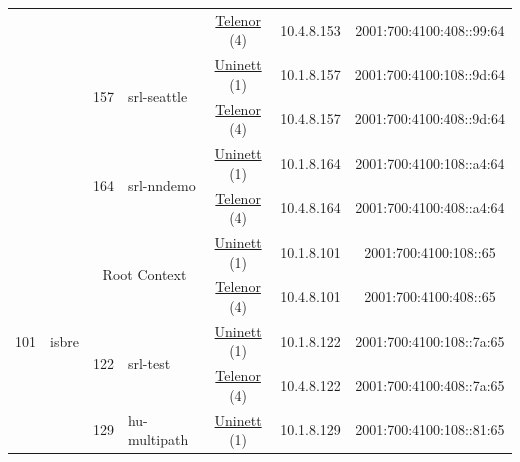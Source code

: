 \begin{small}
\begin{center}
\begin{longtable}{|c|c|c|c|c|c|c|c|}
  &  &  &  & \multicolumn{2}{|c|}{\tiny{\href{https://www.telenor.no}{Telenor} (4)}} & \tiny{10.4.8.153} & \tiny{2001:700:4100:408::99:64} \\* \cline{3-3}\cline{4-4}\cline{5-5}\cline{6-6}\cline{7-7}\cline{8-8}
  &  & \multirow{2}{*}{\tiny{157}} & \multicolumn{1}{|l|}{\multirow{2}{*}{\tiny{srl-seattle}}} & \multicolumn{2}{|c|}{\tiny{\href{https://www.uninett.no}{Uninett} (1)}} & \tiny{10.1.8.157} & \tiny{2001:700:4100:108::9d:64} \\* \cline{5-5}\cline{6-6}\cline{7-7}\cline{8-8}
  &  &  &  & \multicolumn{2}{|c|}{\tiny{\href{https://www.telenor.no}{Telenor} (4)}} & \tiny{10.4.8.157} & \tiny{2001:700:4100:408::9d:64} \\* \cline{3-3}\cline{4-4}\cline{5-5}\cline{6-6}\cline{7-7}\cline{8-8}
  &  & \multirow{2}{*}{\tiny{164}} & \multicolumn{1}{|l|}{\multirow{2}{*}{\tiny{srl-nndemo}}} & \multicolumn{2}{|c|}{\tiny{\href{https://www.uninett.no}{Uninett} (1)}} & \tiny{10.1.8.164} & \tiny{2001:700:4100:108::a4:64} \\* \cline{5-5}\cline{6-6}\cline{7-7}\cline{8-8}
  &  &  &  & \multicolumn{2}{|c|}{\tiny{\href{https://www.telenor.no}{Telenor} (4)}} & \tiny{10.4.8.164} & \tiny{2001:700:4100:408::a4:64} \\ \hline
 \multirow{20}{*}{\tiny{101}} & \multicolumn{1}{|l|}{\multirow{20}{*}{\tiny{isbre}}} & \multicolumn{2}{|c|}{\multirow{2}{*}{\tiny{Root Context}}} & \multicolumn{2}{|c|}{\tiny{\href{https://www.uninett.no}{Uninett} (1)}} & \tiny{10.1.8.101} & \tiny{2001:700:4100:108::65} \\* \cline{5-5}\cline{6-6}\cline{7-7}\cline{8-8}
  &  & \multicolumn{2}{|c|}{} & \multicolumn{2}{|c|}{\tiny{\href{https://www.telenor.no}{Telenor} (4)}} & \tiny{10.4.8.101} & \tiny{2001:700:4100:408::65} \\* \cline{3-3}\cline{4-4}\cline{5-5}\cline{6-6}\cline{7-7}\cline{8-8}
  &  & \multirow{2}{*}{\tiny{122}} & \multicolumn{1}{|l|}{\multirow{2}{*}{\tiny{srl-test}}} & \multicolumn{2}{|c|}{\tiny{\href{https://www.uninett.no}{Uninett} (1)}} & \tiny{10.1.8.122} & \tiny{2001:700:4100:108::7a:65} \\* \cline{5-5}\cline{6-6}\cline{7-7}\cline{8-8}
  &  &  &  & \multicolumn{2}{|c|}{\tiny{\href{https://www.telenor.no}{Telenor} (4)}} & \tiny{10.4.8.122} & \tiny{2001:700:4100:408::7a:65} \\* \cline{3-3}\cline{4-4}\cline{5-5}\cline{6-6}\cline{7-7}\cline{8-8}
  &  & \multirow{2}{*}{\tiny{129}} & \multicolumn{1}{|l|}{\multirow{2}{*}{\tiny{hu-multipath}}} & \multicolumn{2}{|c|}{\tiny{\href{https://www.uninett.no}{Uninett} (1)}} & \tiny{10.1.8.129} & \tiny{2001:700:4100:108::81:65} \\* \cline{5-5}\cline{6-6}\cline{7-7}\cline{8-8}

\end{longtable}
\end{center}
\end{small}
